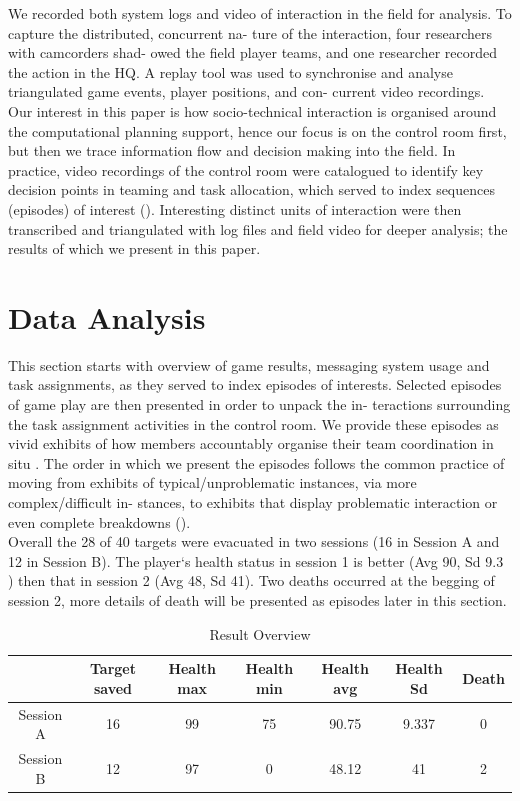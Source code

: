We recorded both system logs and video of interaction in the field for analysis. To capture the distributed, concurrent na- ture of the interaction, four researchers with camcorders shad- owed the field player teams, and one researcher recorded the action in the HQ. A replay tool was used to synchronise and analyse triangulated game events, player positions, and con- current video recordings.\\

Our interest in this paper is how socio-technical interaction is organised around the computational planning support, hence our focus is on the control room first, but then we trace information flow and decision making into the field. In practice, video recordings of the control room were catalogued to identify key decision points in teaming and task allocation, which served to index sequences (episodes) of interest (\cite{Heath2010}). Interesting distinct units of interaction were then transcribed and triangulated with log files and field video for deeper analysis; the results of which we present in this paper.\\


\section{Data Analysis}
This section starts with overview of game results, messaging system usage and task assignments, as they served to index episodes of interests. Selected episodes of game play are then presented in order to unpack the in- teractions surrounding the task assignment activities in the control room. We provide these episodes as vivid exhibits of how members accountably organise their team coordination in situ \cite{Crabtree2012}. The order in which we present the episodes follows the common practice of moving from exhibits of typical/unproblematic instances, via more complex/difficult in- stances, to exhibits that display problematic interaction or even complete breakdowns (\cite{Heath2010}).\\

Overall the 28 of 40 targets were evacuated in two sessions (16 in Session A and 12 in Session B). The player`s health status in session 1 is better  (Avg 90, Sd 9.3 ) then that in session 2 (Avg 48, Sd 41). Two deaths occurred at the begging of session 2, more details of death will be presented as episodes later in this section. \\

\begin{table}[h]
\centering
\footnotesize
\label{my-label}
\begin{tabular}{c|cccccc}
          & Target saved & Health max & Health min & Health avg & Health Sd & Death \\ \hline
Session A & 16           & 99         & 75         & 90.75      & 9.337     & 0     \\
Session B & 12           & 97         & 0          & 48.12      & 41        & 2    
\end{tabular}
\caption{Result Overview}
\label{tab:ResultsOverview}
\end{table}

